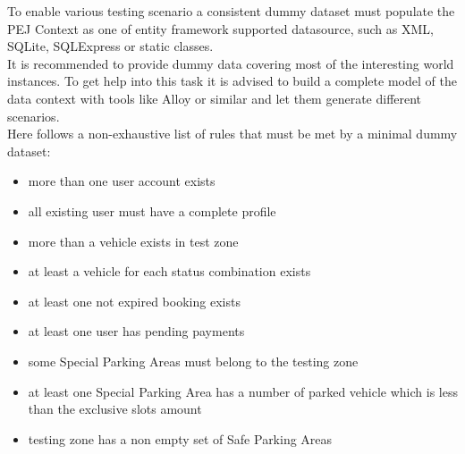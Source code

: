 To enable various testing scenario a consistent dummy dataset must populate the PEJ Context as one of entity framework supported datasource, such as XML, SQLite, SQLExpress or static classes.\\
It is recommended to provide dummy data covering most of the interesting world instances. To get help into this task it is advised to build a complete model of the data context with tools like Alloy or similar and let them generate different scenarios.\\
Here follows a non-exhaustive list of rules that must be met by a minimal dummy dataset:
\begin{itemize}
\item more than one user account exists
\item all existing user must have a complete profile
\item more than a vehicle exists in test zone
\item at least a vehicle for each status combination exists
\item at least one not expired booking exists
\item at least one user has pending payments
\item some Special Parking Areas must belong to the testing zone
\item at least one Special Parking Area has a number of parked vehicle which is less than the exclusive slots amount
\item testing zone has a non empty set of Safe Parking Areas
\end{itemize}
